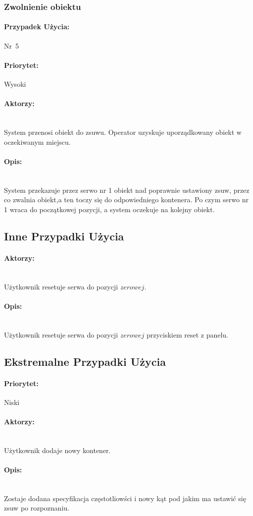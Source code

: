 \documentclass[12pt]{article}
\begin{document}
\subsubsection{Zwolnienie obiektu}
\paragraph{Przypadek Użycia:}\mbox{Nr 5}
\paragraph{Priorytet:}\mbox{Wysoki}	
\paragraph{Aktorzy:}\mbox{} \\
System przenosi obiekt do zsuwu. 
Operator uzyskuje uporządkowany obiekt w oczekiwanym miejscu.
\paragraph{Opis:}\mbox{} \\
System przekazuje przez serwo nr 1 obiekt nad poprawnie ustawiony zsuw, przez  co zwalnia obiekt,a ten toczy się do odpowiedniego kontenera. Po czym serwo nr 1 wraca do początkowej pozycji, a system oczekuje na kolejny obiekt.

\subsection{Inne Przypadki Użycia}
\paragraph{Aktorzy:}\mbox{} \\
Użytkownik resetuje serwa do pozycji $zerowej$.
\paragraph{Opis:}\mbox{} \\
Użytkownik resetuje serwa do pozycji $zerowej$ przyciskiem reset z panelu.

\subsection{Ekstremalne Przypadki Użycia}
\paragraph{Priorytet:}\mbox{Niski}	
\paragraph{Aktorzy:}\mbox{} \\
Użytkownik dodaje nowy kontener.
\paragraph{Opis:}\mbox{} \\
Zostaje dodana specyfikacja częstotliowści i nowy kąt pod jakim ma ustawić się zsuw po rozpoznaniu.
\end{document}
